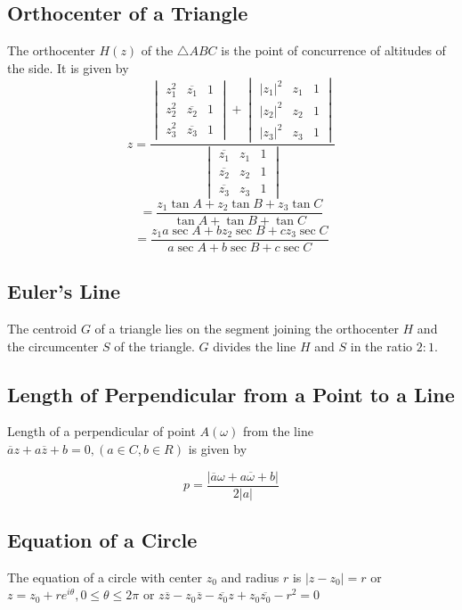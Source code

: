 \subsection{Orthocenter of a Triangle}
The orthocenter $H(z)$ of the $\triangle ABC$ is the point of concurrence of altitudes of the side. It is given by
$$z = \frac{\begin{vmatrix}z_1^2 & \overline{z_1} & 1\\z_2^2 & \overline{z_2} & 1\\z_3^2 & \overline{z_3} & 1\end{vmatrix} + \begin{vmatrix}|z_1|^2 & z_1 & 1\\|z_2|^2 & z_2 & 1\\|z_3|^2 & z_3 & 1\end{vmatrix}}{\begin{vmatrix}\overline{z_1} & z_1 & 1\\\overline{z_2} & z_2 & 1\\\overline{z_3} & z_3 & 1\end{vmatrix}}$$
$$= \frac{z_1\tan A + z_2\tan B + z_3\tan C}{\tan A + \tan B + \tan C}$$
$$= \frac{z_1a\sec A + bz_2\sec B + cz_3\sec C}{a\sec A + b\sec B + c\sec C}$$

\subsection{Euler's Line}
The centroid $G$ of a triangle lies on the segment joining the orthocenter $H$ and the circumcenter $S$ of the triangle. $G$
divides the line $H$ and $S$ in the ratio $2:1$.

\subsection{Length of Perpendicular from a Point to a Line}
Length of a perpendicular of point $A(\omega)$ from the line $\overline{a}z + a\overline{z} + b = 0, (a\in C, b\in R)$
is given by

$$p = \frac{|\overline{a}\omega + a\overline{\omega} + b|}{2|a|}$$

\subsection{Equation of a Circle}
The equation of a circle with center $z_0$ and radius $r$ is $|z- z_0| = r$ or $z = z_0 + re^{i\theta}, 0\leq \theta\leq 2\pi$ or
$z\overline{z} - z_0\overline{z} - \overline{z_0}z + z_0\overline{z_0} - r^2 = 0$

